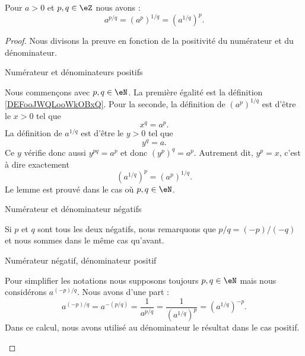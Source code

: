 \begin{lemma}        \label{LEMooIDLJooZALNaD}
    Pour \( a>0\) et \( p,q\in \eZ\) nous avons :
    \begin{equation}
        a^{p/q}=(a^p)^{1/q}=(a^{1/q})^p.
    \end{equation}
\end{lemma}

\begin{proof}
    Nous divisons la preuve en fonction de la positivité du numérateur et du dénominateur.
    \begin{subproof}
        \item[Numérateur et dénominateurs positifs]
                
            Nous commençons avec \( p,q\in \eN\). La première égalité est la définition \ref{DEFooJWQLooWkOBxQ}. Pour la seconde, la définition de \( (a^p)^{1/q}\) est d'être le \( x>0\) tel que
            \begin{equation}
                x^q=a^p.
            \end{equation}
            La définition de \( a^{1/q}\) est d'être le \( y>0\) tel que
            \begin{equation}
                y^q=a.
            \end{equation}
            Ce \( y\) vérifie donc aussi \( y^{pq}=a^p\) et donc \( (y^p)^q=a^p\). Autrement dit, \( y^p=x\), c'est à dire exactement
            \begin{equation}
                (a^{1/q})^p=(a^p)^{1/q}.
            \end{equation}
            Le lemme est prouvé dans le cas où \( p,q\in \eN\).

        \item[Numérateur et dénominateur négatifs]

            Si \( p\) et \( q\) sont tous les deux négatifs, nous remarquons que \( p/q=(-p)/(-q)\) et nous sommes dans le même cas qu'avant.

        \item[Numérateur négatif, dénominateur positif]

            Pour simplifier les notations nous supposons toujours \( p,q\in \eN\) mais nous considérons \( a^{(-p)/q}\). Nous avons d'une part :
            \begin{equation}
                a^{(-p)/q}=a^{-(p/q)}=\frac{1}{ a^{p/q} }=\frac{1}{ (a^{1/q})^p }=(a^{1/q})^{-p}.   
            \end{equation}
            Dans ce calcul, nous avons utilisé au dénominateur le résultat dans le cas positif. 


\end{subproof}
\end{proof}
